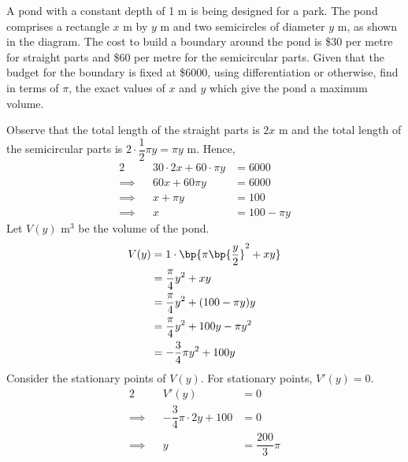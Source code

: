 \documentclass{echw}
\begin{document}

    \problem{}
        \begin{center}
        \end{center}

        A pond with a constant depth of 1 m is being designed for a park. The pond comprises a rectangle $x$ m by $y$ m and two semicircles of diameter $y$ m, as shown in the diagram. The cost to build a boundary around the pond is \$30 per metre for straight parts and \$60 per metre for the semicircular parts. Given that the budget for the boundary is fixed at \$6000, using differentiation or otherwise, find in terms of $\pi$, the exact values of $x$ and $y$ which give the pond a maximum volume.

    \solution
        Observe that the total length of the straight parts is $2x$ m and the total length of the semicircular parts is $2 \cdot \dfrac12 \pi y = \pi y$ m. Hence,
        \begin{alignat*}{2}
            &&30 \cdot 2x + 60 \cdot \pi y &= 6000\\
            \implies&&60x + 60 \pi y &= 6000\\
            \implies&&x + \pi y &= 100\\
            \implies&&x &= 100 - \pi y
        \end{alignat*}
        Let $V(y)$ m$^3$ be the volume of the pond.
        \begin{align*}
            V(y) &= 1 \cdot \bp{\pi \bp{\dfrac{y}2}^2 + xy}\\
            &= \dfrac{\pi}4 y^2 + xy\\
            &= \dfrac{\pi}4 y^2 + (100 - \pi y )y\\
            &= \dfrac{\pi}4 y^2 + 100y - \pi y^2\\
            &= - \dfrac{3}4 \pi y^2 + 100y
        \end{align*}
        Consider the stationary points of $V(y)$. For stationary points, $V'(y) = 0$.
        \begin{alignat*}{2}
            &&V'(y) &= 0\\
            \implies&&-\dfrac34 \pi \cdot 2y + 100 &= 0\\
            \implies&& y &= \dfrac{200}3 \pi
        \end{alignat*}
\end{document}
